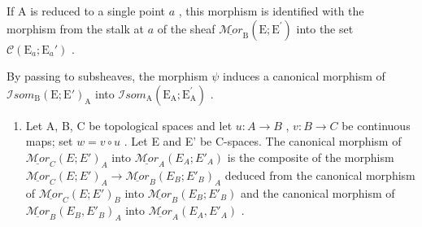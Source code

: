 If A is reduced to a single point \(a\) , this morphism is identified with the morphism from the stalk at \(a\) of the sheaf \(\underline{\mathcal{M}or}_{\mathrm{B}}(\mathrm{E};\mathrm{E}^{\prime})\) into the set \(\mathcal{C}(\mathrm{E}_a;\mathrm{E}_a')\) .

By passing to subsheaves, the morphism \(\psi\) induces a canonical morphism of \(\mathcal{I}som_{\mathrm{B}}(\mathrm{E};\mathrm{E}')_{\mathrm{A}}\) into \(\mathcal{I}som_{\mathrm{A}}(\mathrm{E}_{\mathrm{A}};\mathrm{E}_{\mathrm{A}}^{\prime})\) .

\begin{enumerate}
\def\labelenumi{\arabic{enumi})}
\setcounter{enumi}{1}
\tightlist
\item
  Let A, B, C be topological spaces and let \(u\colon A\to B\) , \(v\colon B\to C\) be continuous maps; set \(w=v\circ u\) . Let E and E' be C-spaces. The canonical morphism of \(\underline{\mathcal{M}or}_{C}(E;E')_{A}\) into \(\underline{\mathcal{M}or}_{A}(E_{A};E'_{A})\) is the composite of the morphism \(\underline{\mathcal{M}or}_{C}(E;E')_{A}\to\underline{\mathcal{M}or}_{B}(E_{B};E'_{B})_{A}\) deduced from the canonical morphism of \(\underline{\mathcal{M}or}_{C}(E;E')_{B}\) into \(\underline{\mathcal{M}or}_{B}(E_{B};E'_{B})\) and the canonical morphism of \(\underline{\mathcal{M}or}_{B}(E_{B},E'_{B})_{A}\) into \(\underline{\mathcal{M}or}_{A}(E_{A},E'_{A})\) .
\end{enumerate}
\relax{}
